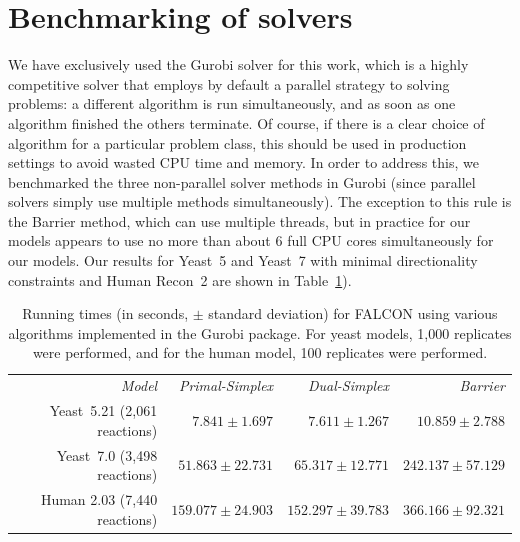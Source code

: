 \clearpage

\section{Benchmarking of solvers}
We have exclusively used the Gurobi solver \citep{gurobi} for this
work, which is a highly competitive solver that employs by default a
parallel strategy to solving problems: a different algorithm is run
simultaneously, and as soon as one algorithm finished the others
terminate. Of course, if there is a clear choice of algorithm for a
particular problem class, this should be used in production settings
to avoid wasted CPU time and memory. In order to address this, we
benchmarked the three non-parallel solver methods in Gurobi
 (since parallel solvers simply use multiple methods simultaneously).
The exception to this rule is the Barrier method, which can use
multiple threads, but in practice for our models appears to use
no more than about 6 full CPU cores simultaneously for our models.
Our results for Yeast~5 and Yeast~7 with minimal directionality constraints
\citep{Heavner2012,Lee2012,Aung2013} and Human Recon~2 \citep{Thiele2013}
are shown in \suppOrApp Table~\ref{tab:methodTime}).

\begin{table}
\begin{center}
\begin{tabular}{rrrr}
\emph{Model}                 & \emph{Primal-Simplex} & \emph{Dual-Simplex} & \emph{Barrier} \\
Yeast~5.21 (2,061 reactions) & $ 7.841 \pm 1.697    $ & $ 7.611 \pm 1.267    $ & $ 10.859 \pm 2.788   $\\ 
Yeast~7.0 (3,498 reactions)  & $ 51.863 \pm 22.731  $ & $ 65.317 \pm 12.771  $ & $ 242.137 \pm 57.129 $\\
Human 2.03 (7,440 reactions) & $ 159.077 \pm 24.903 $ & $ 152.297 \pm 39.783 $ & $ 366.166 \pm 92.321 $\\
\end{tabular}
\end{center}
\caption{Running times (in seconds, $\pm$ standard deviation) for
  FALCON using various algorithms implemented in the Gurobi package.
  For yeast models, 1,000 replicates were performed, and for the human
  model, 100 replicates were performed.}
\label{tab:methodTime}
\end{table}

